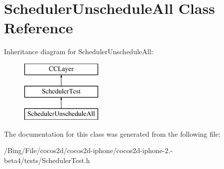 \hypertarget{interface_scheduler_unschedule_all}{\section{Scheduler\-Unschedule\-All Class Reference}
\label{interface_scheduler_unschedule_all}
}
Inheritance diagram for Scheduler\-Unschedule\-All\-:\begin{figure}[H]
\begin{center}
\leavevmode
\includegraphics[height=3.000000cm]{interface_scheduler_unschedule_all}
\end{center}
\end{figure}


The documentation for this class was generated from the following file\-:\begin{DoxyCompactItemize}
\item 
/\-Bing/\-File/cocos2d/cocos2d-\/iphone/cocos2d-\/iphone-\/2.-\/beta4/tests/Scheduler\-Test.\-h\end{DoxyCompactItemize}
